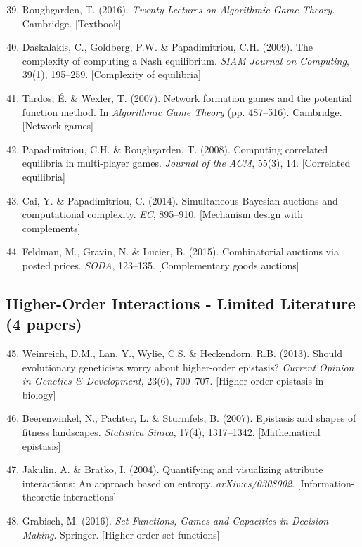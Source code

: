 \begin{enumerate}
    \setcounter{enumi}{38}
    \item Roughgarden, T. (2016). \textit{Twenty Lectures on Algorithmic Game Theory}. Cambridge. [Textbook]

    \item Daskalakis, C., Goldberg, P.W. \& Papadimitriou, C.H. (2009). The complexity of computing a Nash equilibrium. \textit{SIAM Journal on Computing}, 39(1), 195--259. [Complexity of equilibria]

    \item Tardos, É. \& Wexler, T. (2007). Network formation games and the potential function method. In \textit{Algorithmic Game Theory} (pp. 487--516). Cambridge. [Network games]

    \item Papadimitriou, C.H. \& Roughgarden, T. (2008). Computing correlated equilibria in multi-player games. \textit{Journal of the ACM}, 55(3), 14. [Correlated equilibria]

    \item Cai, Y. \& Papadimitriou, C. (2014). Simultaneous Bayesian auctions and computational complexity. \textit{EC}, 895--910. [Mechanism design with complements]

    \item Feldman, M., Gravin, N. \& Lucier, B. (2015). Combinatorial auctions via posted prices. \textit{SODA}, 123--135. [Complementary goods auctions]
\end{enumerate}

\subsection{Higher-Order Interactions - Limited Literature (4 papers)}

\begin{enumerate}
    \setcounter{enumi}{44}
    \item Weinreich, D.M., Lan, Y., Wylie, C.S. \& Heckendorn, R.B. (2013). Should evolutionary geneticists worry about higher-order epistasis? \textit{Current Opinion in Genetics \& Development}, 23(6), 700--707. [Higher-order epistasis in biology]

    \item Beerenwinkel, N., Pachter, L. \& Sturmfels, B. (2007). Epistasis and shapes of fitness landscapes. \textit{Statistica Sinica}, 17(4), 1317--1342. [Mathematical epistasis]

    \item Jakulin, A. \& Bratko, I. (2004). Quantifying and visualizing attribute interactions: An approach based on entropy. \textit{arXiv:cs/0308002}. [Information-theoretic interactions]

    \item Grabisch, M. (2016). \textit{Set Functions, Games and Capacities in Decision Making}. Springer. [Higher-order set functions]
\end{enumerate}

